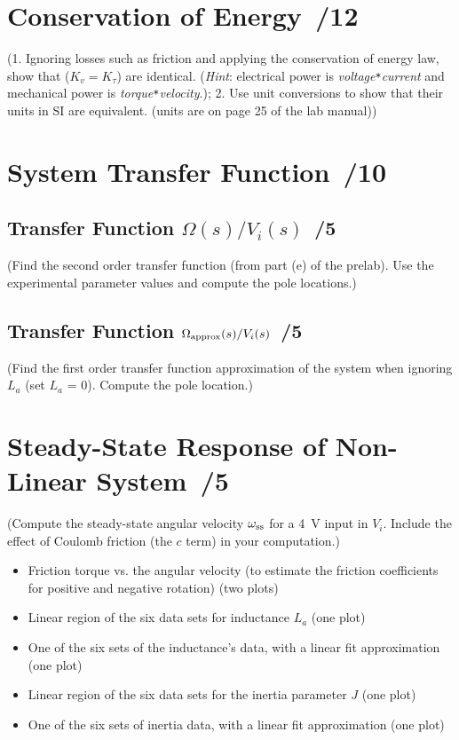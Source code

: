\documentclass{article}
\newcommand{\score}{\hfill \underline{\hspace{0.65cm}}\,/} %
\begin{document}
\section{Conservation of Energy \score 12}
(1. Ignoring losses such as friction and applying the conservation of energy law, show that ($K_v=K_{\tau}$) are identical. (\emph{Hint}: electrical power is \emph{voltage}\verb|*|\emph{current} and mechanical power is \emph{torque}\verb|*|\emph{velocity}.); 2. Use unit conversions to show that their units in SI are equivalent. (units are on page 25 of the lab manual))

\section{System Transfer Function \score 10}
\subsection{Transfer Function $\Omega(s)/V_i(s)$ \score 5}
(Find the second order transfer function (from part (e) of the prelab). Use the experimental parameter values and compute the pole locations.)

\subsection{Transfer Function $\Omega_{\rm approx}(s)/V_i(s)$ \score 5}
(Find the first order transfer function approximation of the system when ignoring $L_a$ (set $L_a$ = 0). Compute the pole location.)

\section{Steady-State Response of Non-Linear System \score 5}
(Compute the steady-state angular velocity $\omega_{\rm ss}$ for a \SI{4}{\volt} input in $V_i$. Include the effect of Coulomb friction (the $c$ term) in your computation.)
\newline \\[3mm]
\begin{itemize}
\item Friction torque vs. the angular velocity (to estimate the friction coefficients for positive and negative rotation) (two plots)
\item Linear region of the six data sets for inductance $L_a$ (one plot)
\item One of the six sets of the inductance's data, with a linear fit approximation (one plot)
\item Linear region of the six data sets for the inertia parameter $J$ (one plot)
\item One of the six sets of inertia data, with a linear fit approximation (one plot)
\end{itemize}
\end{document}
